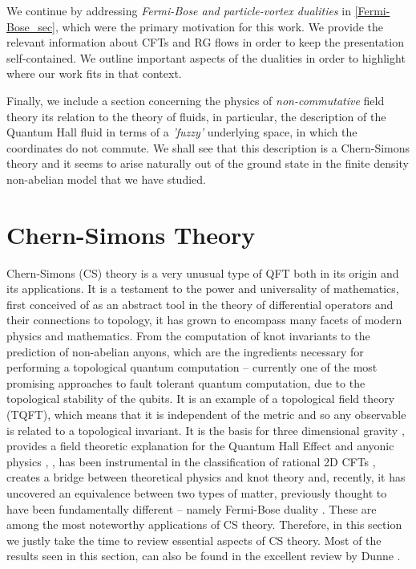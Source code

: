     We continue by addressing \textit{Fermi-Bose and particle-vortex dualities} in \ref{Fermi-Bose_sec}, which were the primary motivation for this work. We provide the relevant information about CFTs and RG flows in order to keep the presentation self-contained. We outline important aspects of the dualities in order to highlight where our work fits in that context.

    Finally, we include a section concerning the physics of \textit{non-commutative} field theory its relation to the theory of fluids, in particular, the description of the Quantum Hall fluid in terms of a \textit{'fuzzy'} underlying space, in which the coordinates do not commute. We shall see that this description is a Chern-Simons theory and it seems to arise naturally out of the ground state in the finite density non-abelian model that we have studied.

        \section{Chern-Simons Theory} \label{CS_sec}
    Chern-Simons (CS) theory is a very unusual type of QFT both in its origin and its applications. It is a testament to the power and universality of mathematics, first conceived of as an abstract tool in the theory of differential operators and their connections to topology, it has grown to encompass many facets of modern physics and mathematics. From the computation of knot invariants to the prediction of non-abelian anyons, which are the ingredients necessary for performing a topological quantum computation -- currently one of the most promising approaches to fault tolerant quantum computation, due to the topological stability of the qubits. It is an example of a topological field theory (TQFT), which means that it is independent of the metric and so any observable is related to a topological invariant. It is the basis for three dimensional gravity \cite{gr-qc/0503022}, provides a field theoretic explanation for the Quantum Hall Effect and anyonic physics \cite{cond-mat/9501022}, \cite{1606.06687}, has been instrumental in the classification of rational 2D CFTs \cite{Moore1989}, creates a bridge between theoretical physics and knot theory \cite{Witten1989} and, recently, it has uncovered an equivalence between two types of matter, previously thought to have been fundamentally different -- namely Fermi-Bose duality \cite{1512.00161}. These are among the most noteworthy applications of CS theory. Therefore, in this section we justly take the time to review essential aspects of CS theory. Most of the results seen in this section, can also be found in the excellent review by Dunne \cite{hep-th/9902115}.

